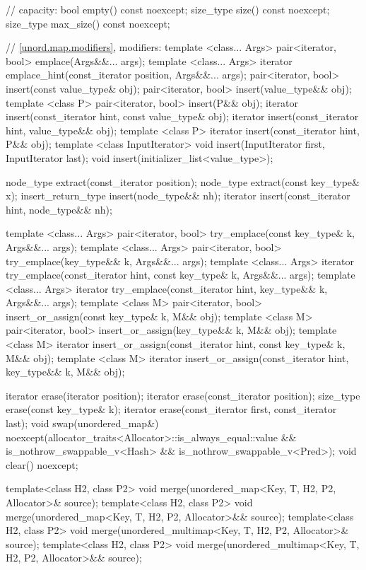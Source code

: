 \begin{codeblock}
{{    // capacity:
    bool      empty() const noexcept;
    size_type size() const noexcept;
    size_type max_size() const noexcept;

    // \ref{unord.map.modifiers}, modifiers:
    template <class... Args> pair<iterator, bool> emplace(Args&&... args);
    template <class... Args> iterator emplace_hint(const_iterator position, Args&&... args);
    pair<iterator, bool> insert(const value_type& obj);
    pair<iterator, bool> insert(value_type&& obj);
    template <class P> pair<iterator, bool> insert(P&& obj);
    iterator       insert(const_iterator hint, const value_type& obj);
    iterator       insert(const_iterator hint, value_type&& obj);
    template <class P> iterator insert(const_iterator hint, P&& obj);
    template <class InputIterator> void insert(InputIterator first, InputIterator last);
    void insert(initializer_list<value_type>);

    node_type extract(const_iterator position);
    node_type extract(const key_type& x);
    insert_return_type insert(node_type&& nh);
    iterator           insert(const_iterator hint, node_type&& nh);

    template <class... Args>
      pair<iterator, bool> try_emplace(const key_type& k, Args&&... args);
    template <class... Args>
      pair<iterator, bool> try_emplace(key_type&& k, Args&&... args);
    template <class... Args>
      iterator try_emplace(const_iterator hint, const key_type& k, Args&&... args);
    template <class... Args>
      iterator try_emplace(const_iterator hint, key_type&& k, Args&&... args);
    template <class M>
      pair<iterator, bool> insert_or_assign(const key_type& k, M&& obj);
    template <class M>
      pair<iterator, bool> insert_or_assign(key_type&& k, M&& obj);
    template <class M>
      iterator insert_or_assign(const_iterator hint, const key_type& k, M&& obj);
    template <class M>
      iterator insert_or_assign(const_iterator hint, key_type&& k, M&& obj);

    iterator  erase(iterator position);
    iterator  erase(const_iterator position);
    size_type erase(const key_type& k);
    iterator  erase(const_iterator first, const_iterator last);
    void      swap(unordered_map&)
      noexcept(allocator_traits<Allocator>::is_always_equal::value &&
               is_nothrow_swappable_v<Hash> &&
               is_nothrow_swappable_v<Pred>);
    void      clear() noexcept;

    template<class H2, class P2>
      void merge(unordered_map<Key, T, H2, P2, Allocator>& source);
    template<class H2, class P2>
      void merge(unordered_map<Key, T, H2, P2, Allocator>&& source);
    template<class H2, class P2>
      void merge(unordered_multimap<Key, T, H2, P2, Allocator>& source);
    template<class H2, class P2>
      void merge(unordered_multimap<Key, T, H2, P2, Allocator>&& source);

}}
\end{codeblock}
